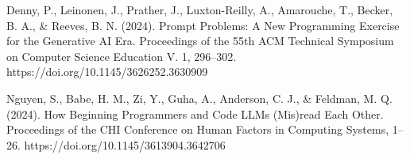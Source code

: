 \documentclass[12pt]{extarticle}
\begin{document}
\begin{thebibliography}{9}
Denny, P., Leinonen, J., Prather, J., Luxton-Reilly, A., Amarouche, T., Becker, B. A., \& Reeves, B. N. (2024). Prompt Problems: A New Programming Exercise for the Generative AI Era. Proceedings of the 55th ACM Technical Symposium on Computer Science Education V. 1, 296–302. https://doi.org/10.1145/3626252.3630909

Nguyen, S., Babe, H. M., Zi, Y., Guha, A., Anderson, C. J., \& Feldman, M. Q. (2024). How Beginning Programmers and Code LLMs (Mis)read Each Other. Proceedings of the CHI Conference on Human Factors in Computing Systems, 1–26. https://doi.org/10.1145/3613904.3642706

\end{thebibliography}
\end{document}
